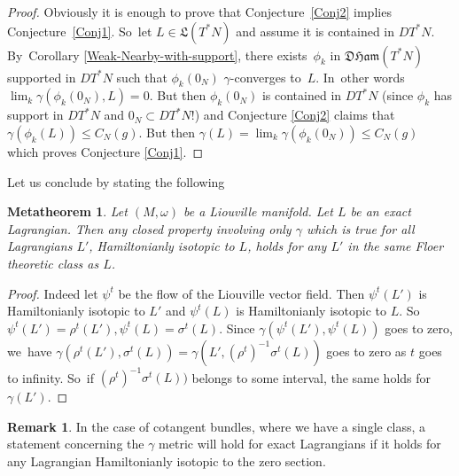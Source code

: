 \documentclass[JEP,XML,SOM,Unicode,NoFloatCountersInSection,published]{cedram}
\newtheorem{metatheorem}[thm]{Metatheorem}
\theoremstyle{definition}
\newtheorem{rem}[thm]{Remark}
\newcommand{\DHam}{\mathfrak{DHam}}
\begin{document}
\begin{proof}
Obviously it is enough to prove that Conjecture~\ref{Conj2} implies Conjecture~\ref{Conj1}. So~let $L\in {\mathfrak L}(T^*N)$ and assume it is contained in $DT^*N$. By~Corollary \ref{Weak-Nearby-with-support}, there exists~$\phi_k$ in $\DHam (T^*N)$ supported in $DT^*N$ such that $\phi_k(0_N)$ $\gamma$\nobreakdash-converges to~$L$. In~other words
$\lim_k \gamma(\phi_k(0_N),L)=0$. But then $\phi_k(0_N)$ is contained in $DT^*N$ (since $\phi_k$ has support in $DT^*N$ and $0_N\subset DT^*N$!) and Conjecture \ref{Conj2} claims that $\gamma(\phi_k(L))\leq C_N(g)$. But then $\gamma(L)=\lim_k \gamma(\phi_k(0_N))\leq C_N(g)$ which proves Conjecture \ref{Conj1}.
\end{proof}

Let us conclude by stating the following
\begin{metatheorem}
Let $(M,\omega)$ be a Liouville manifold. Let $L$ be an exact Lagrangian. Then any closed property involving only $\gamma$ which is true for all Lagrangians $L'$, Hamiltonianly isotopic to $L$, holds for any $L'$ in the same Floer theoretic class as $L$.
\end{metatheorem}
\begin{proof}
Indeed let $\psi^t$ be the flow of the Liouville vector field. Then $\psi^t(L')$ is Hamiltonianly isotopic to $L'$ and $\psi^t(L)$ is Hamiltonianly isotopic to $L$. So~$\psi^t(L')=\rho^t(L'), \psi^t(L)=\sigma^t(L)$. Since $\gamma (\psi^t(L'),\psi^t(L))$ goes to zero, we~have $\gamma(\rho^t(L'),\sigma^t(L))= \gamma(L', (\rho^t)^{-1}\sigma^t(L))$ goes to zero as $t$ goes to infinity. So~if
$(\rho^t)^{-1}\sigma^t(L))$ belongs to some interval, the same holds for $\gamma(L')$.
\end{proof}

\begin{rem}
In the case of cotangent bundles, where we have a single class, a statement concerning the $\gamma$ metric will hold for exact Lagrangians if it holds for any Lagrangian Hamiltonianly isotopic to the zero section.
\end{rem}
\end{document}
